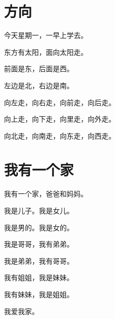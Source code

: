 \documentclass[12pt,UTF-8,openany]{ctexbook}
\begin{document}
\chapter{方向}

\begin{large}
    
    今天星期一，一早上学去。
    
    东方有太阳，面向太阳走。
    
    前面是东，后面是西。
    
    左边是北，右边是南。
    
    向左走，向右走，向前走，向后走。
    
    向上走，向下走，向里走，向外走。
    
    向北走，向南走，向东走，向西走。
    
\end{large}


\clearpage

\begin{center}
    
    
    
\end{center}


\hanzibox{}\hanzibox{}\hanzibox{}\hanzibox{}\hspace{1em}\hanzibox{}\hanzibox{}\hanzibox{}\hanzibox{}

\hanzibox{}\hanzibox{}\hanzibox{}\hanzibox{}\hspace{1em}\hanzibox{}\hanzibox{}\hanzibox{}\hanzibox{}

\hanzibox{}\hanzibox{}\hanzibox{}\hanzibox{}\hspace{1em}\hanzibox{}\hanzibox{}\hanzibox{}\hanzibox{}

\hanzibox{}\hanzibox{}\hanzibox{}\hanzibox{}\hspace{1em}\hanzibox{}\hanzibox{}\hanzibox{}\hanzibox{}






\chapter{我有一个家}

\begin{large}
    
    我有一个家，爸爸和妈妈。
    
    我是儿子。我是女儿。
    
    我是男的。我是女的。
    
    我是哥哥，我有弟弟。
    
    我是弟弟，我有哥哥。
    
    我有姐姐，我是妹妹。
    
    我有妹妹，我是姐姐。
    
    我爱我家。
    
\end{large}
\end{document}
